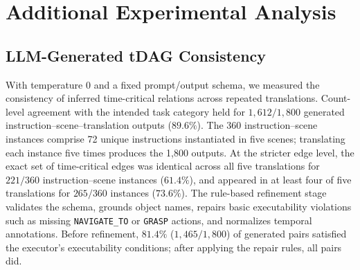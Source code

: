 \documentclass[letterpaper,10pt,onecolumn]{IEEEtran}
\begin{document}
\section{Additional Experimental Analysis}
\subsection{LLM-Generated tDAG Consistency}\label{supp:consistency}
With temperature $0$ and a fixed prompt/output schema, we measured the
consistency of inferred time-critical relations across repeated translations.
Count-level agreement with the intended task category held for
$1{,}612/1{,}800$ generated instruction--scene--translation outputs
($89.6\%$). The 360 instruction--scene instances comprise 72 unique
instructions instantiated in five scenes; translating each instance five
times produces the 1,800 outputs. At the stricter edge level, the exact set
of time-critical edges was identical across all five translations for
$221/360$ instruction--scene instances ($61.4\%$), and appeared in at least
four of five translations for $265/360$ instances ($73.6\%$).
The rule-based refinement stage validates the schema, grounds object names,
repairs basic executability violations such as missing \texttt{NAVIGATE\_TO}
or \texttt{GRASP} actions, and normalizes temporal annotations. Before
refinement, $81.4\%$ ($1{,}465/1{,}800$) of generated pairs satisfied the
executor's executability conditions; after applying the repair rules, all
pairs did.
\end{document}
